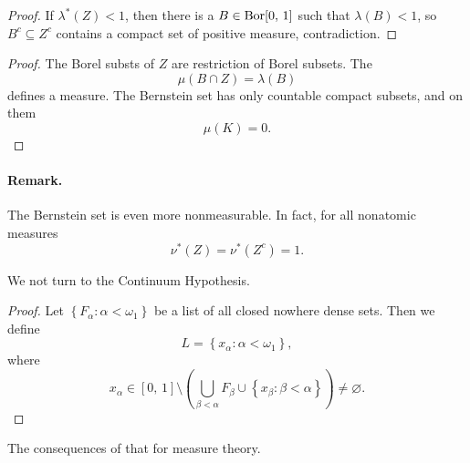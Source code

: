 \begin{proof}
    If \(\lambda^*(Z) < 1 \), then there is a \( B \in \operatorname{Bor} [0,\,1] \) such that \(\lambda(B) < 1 \), so \( B^c \subseteq Z^c \) contains a compact set of positive measure, contradiction.
\end{proof}


\begin{proof}
The Borel substs of \( Z \) are restriction of Borel subsets. The
\[ 
    \mu(B \cap Z) =\lambda(B) 
\]
defines a measure. The Bernstein set has only countable compact subsets, and on them 
\[ 
    \mu(K) = 0. 
\]
\end{proof}

\paragraph{Remark.} The Bernstein set is even more nonmeasurable. In fact, for all nonatomic measures
\[ 
    \nu^* (Z) = \nu^* (Z^c) = 1. 
\]

We not turn to the Continuum Hypothesis.

\begin{proof}
Let \( \left\{ F_\alpha : \alpha < \omega_1 \right\} \) be a list of all closed nowhere dense sets. Then we define
\[ 
    L = \left\{ x_\alpha : \alpha < \omega_1 \right\}, 
\]
where
\[ 
    x_\alpha \in [0,\,1] \setminus \left( \bigcup_{\beta < \alpha} F_\beta \cup \left\{ x_\beta : \beta < \alpha \right\} \right) \neq \varnothing.
\]
\end{proof}

The consequences of that for measure theory.


